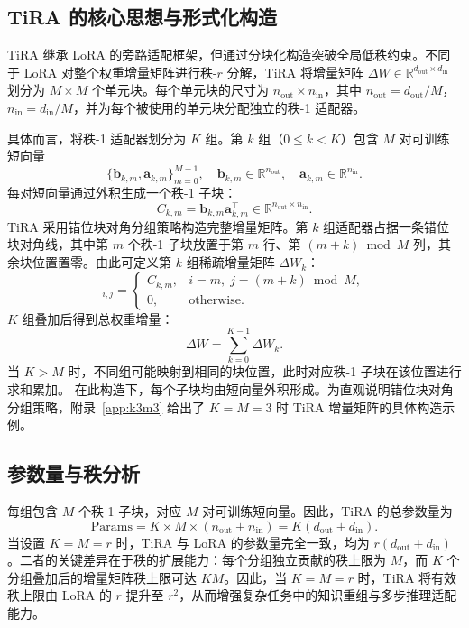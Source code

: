\documentclass[UTF8,a4paper,11pt]{ctexart}
\newcommand{\R}{\mathbb{R}}
\newcommand{\DeltaW}{\Delta W}
\begin{document}
\subsection{TiRA 的核心思想与形式化构造}

TiRA 继承 LoRA 的旁路适配框架，但通过分块化构造突破全局低秩约束。不同于 LoRA 对整个权重增量矩阵进行秩-$r$ 分解，TiRA 将增量矩阵 $\DeltaW\in\R^{d_{\mathrm{out}}\times d_{\mathrm{in}}}$ 划分为 $M\times M$ 个单元块。每个单元块的尺寸为 $n_{\mathrm{out}}\times n_{\mathrm{in}}$，其中 $n_{\mathrm{out}}=d_{\mathrm{out}}/M$，$n_{\mathrm{in}}=d_{\mathrm{in}}/M$，并为每个被使用的单元块分配独立的秩-1 适配器。

具体而言，将秩-1 适配器划分为 $K$ 组。第 $k$ 组（$0\leq k<K$）包含 $M$ 对可训练短向量
\begin{equation}
    \{\bm{b}_{k,m},\bm{a}_{k,m}\}_{m=0}^{M-1},\quad
    \bm{b}_{k,m}\in\R^{n_{\mathrm{out}}},\quad
    \bm{a}_{k,m}\in\R^{n_{\mathrm{in}}}.
\end{equation}
每对短向量通过外积生成一个秩-1 子块：
\begin{equation}
    C_{k,m}=\bm{b}_{k,m}\bm{a}_{k,m}^{\top}\in\R^{n_{\mathrm{out}}\times n_{\mathrm{in}}}.
\end{equation}
TiRA 采用错位块对角分组策略构造完整增量矩阵。第 $k$ 组适配器占据一条错位块对角线，其中第 $m$ 个秩-1 子块放置于第 $m$ 行、第 $(m+k)\bmod M$ 列，其余块位置置零。由此可定义第 $k$ 组稀疏增量矩阵 $\Delta W_k$：
\begin{equation}
    [\Delta W_k]_{i,j}=
    \begin{cases}
        C_{k,m}, & i=m,\; j=(m+k)\bmod M,\\
        0, & \text{otherwise}.
    \end{cases}
\end{equation}
$K$ 组叠加后得到总权重增量：
\begin{equation}
    \DeltaW = \sum_{k=0}^{K-1}\Delta W_k.
\end{equation}
当 $K>M$ 时，不同组可能映射到相同的块位置，此时对应秩-1 子块在该位置进行求和累加。
在此构造下，每个子块均由短向量外积形成。为直观说明错位块对角分组策略，附录~\ref{app:k3m3} 给出了 $K=M=3$ 时 TiRA 增量矩阵的具体构造示例。

\subsection{参数量与秩分析}

每组包含 $M$ 个秩-1 子块，对应 $M$ 对可训练短向量。因此，TiRA 的总参数量为
\begin{equation}
    \mathrm{Params}=K\times M\times(n_{\mathrm{out}}+n_{\mathrm{in}})=K(d_{\mathrm{out}}+d_{\mathrm{in}}).
\end{equation}
当设置 $K=M=r$ 时，TiRA 与 LoRA 的参数量完全一致，均为 $r(d_{\mathrm{out}}+d_{\mathrm{in}})$。二者的关键差异在于秩的扩展能力：每个分组独立贡献的秩上限为 $M$，而 $K$ 个分组叠加后的增量矩阵秩上限可达 $KM$。因此，当 $K=M=r$ 时，TiRA 将有效秩上限由 LoRA 的 $r$ 提升至 $r^2$，从而增强复杂任务中的知识重组与多步推理适配能力。
\end{document}
